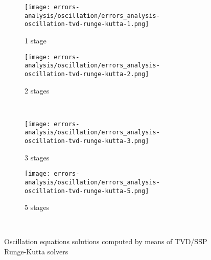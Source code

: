 \documentclass[pdftex,preprint,3p,times,numbers]{elsarticle}
\begin{document}
\begin{figure}[!ht]
  \centering
  \begin{subfigure}[b]{0.45\textwidth}
    \centering
    \texttt{[image: errors-analysis/oscillation/errors\_analysis-oscillation-tvd-runge-kutta-1.png]}
    \caption{1 stage}\label{fig:results-oscillation-tvd-runge-kutta-1}
  \end{subfigure}\quad%
  \begin{subfigure}[b]{0.45\textwidth}
    \centering
    \texttt{[image: errors-analysis/oscillation/errors\_analysis-oscillation-tvd-runge-kutta-2.png]}
    \caption{2 stages}\label{fig:results-oscillation-tvd-runge-kutta-2}
  \end{subfigure}\\
  \begin{subfigure}[b]{0.45\textwidth}
    \centering
    \texttt{[image: errors-analysis/oscillation/errors\_analysis-oscillation-tvd-runge-kutta-3.png]}
    \caption{3 stages}\label{fig:results-oscillation-tvd-runge-kutta-3}
  \end{subfigure}\quad%
  \begin{subfigure}[b]{0.45\textwidth}
    \centering
    \texttt{[image: errors-analysis/oscillation/errors\_analysis-oscillation-tvd-runge-kutta-5.png]}
    \caption{5 stages}\label{fig:results-oscillation-tvd-runge-kutta-5}
  \end{subfigure}\\
  \caption{Oscillation equations solutions computed by means of TVD/SSP Runge-Kutta solvers}\label{fig:results-oscillation-tvd-runge-kutta}
\end{figure}
\end{document}
